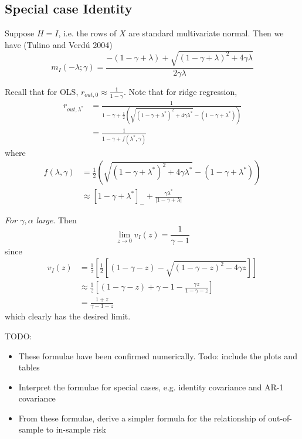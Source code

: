 \documentclass[11pt]{article}
\begin{document}
\subsection{Special case Identity}

Suppose $H = I$, i.e. the rows of $X$ are standard multivariate normal.
Then we have (Tulino and Verd\'{u} 2004)
\[
m_I(-\lambda; \gamma) = \frac{-(1 - \gamma + \lambda) + \sqrt{(1-\gamma + \lambda)^2 + 4\gamma \lambda}}{2\gamma \lambda}
\]

Recall that for OLS, $r_{out, 0} \approx \frac{1}{1-\gamma}$. Note that for ridge regression,
\begin{align*}
r_{out,\lambda^*} &= \frac{1}{1- \gamma  + \frac{1}{2}(\sqrt{(1-\gamma + \lambda^*)^2 + 4\gamma\lambda^*} - (1-\gamma + \lambda^*))}
\\&= \frac{1}{1 - \gamma + f(\lambda^*,\gamma)}
\end{align*}
where
\begin{align*}
f(\lambda, \gamma) &= \frac{1}{2}(\sqrt{(1-\gamma + \lambda^*)^2 + 4\gamma\lambda^*} - (1-\gamma + \lambda^*)) 
\\&\approx [1-\gamma + \lambda^*]_{-}+ \frac{\gamma \lambda^*}{|1-\gamma + \lambda|}
\end{align*}

\noindent\emph{For $\gamma, \alpha$ large}.  Then
\[
\lim_{z \to 0} v_I(z) = \frac{1}{\gamma - 1}
\]
since
\begin{align*}
v_I(z) &= \frac{1}{z}\left[\frac{1}{2}\left[(1-\gamma - z) - \sqrt{(1 - \gamma -z)^2 - 4 \gamma z}\right]\right]
\\&\approx \frac{1}{z}\left[(1-\gamma - z) + \gamma - 1 - \frac{\gamma z}{1-\gamma - z}\right]
\\&= \frac{1 + z}{\gamma - 1 - z}
\end{align*}
which clearly has the desired limit.


TODO:
\begin{itemize}
\item These formulae have been confirmed numerically.  Todo: include the plots and tables
\item Interpret the formulae for special cases, e.g. identity covariance and AR-1 covariance
\item From these formulae, derive a simpler formula for the relationship of out-of-sample to in-sample risk
\end{itemize}
\end{document}
